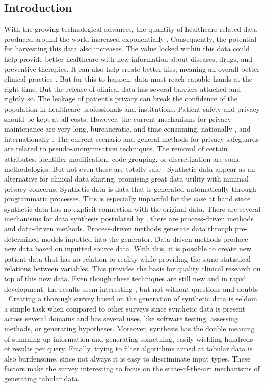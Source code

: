 
\subsection{Introduction}

With the growing technological advances, the quantity of healthcare-related data produced around the world increased exponentially \cite{choi_generating_2017,henry_adoption_2016}.
Consequently, the potential for harvesting this data also increases. The value locked within
this data could help provide better healthcare with new information about diseases,
drugs, and preventive therapies. It can also help create better \acp{his}, meaning an overall better clinical practice \cite{ISI:000502534100049}. But for this to happen, data must reach capable hands at the right time.
But the release of clinical data has several barriers attached and rightly so. The leakage of patient’s privacy can break the confidence of the population in healthcare
professionals and institutions. Patient safety
and privacy should be kept at all costs. However, the current mechanisms for privacy maintenance are very long, bureaucratic, and time-consuming, nationally \cite{comissao_nacional_protecao_de_dados_principios_2015}, and internationally \cite{office_for_civil_rights_guidance_2013}. The current scenario and general methods for privacy safeguards are related to pseudo-anonymisation techniques.
The removal of certain attributes, identifier modification, code grouping, or discretization are some methodologies. But not even these are totally safe \cite{el_emam_systematic_2011}.
Synthetic data appear as an alternative for clinical data sharing, promising great data
utility with minimal privacy concerns. Synthetic data is data that is generated automatically through programmatic processes. This is especially impactful for the case at hand
since synthetic data has no explicit connection with the original data. There are several
mechanisms for data synthesis postulated by \cite{goncalves_generation_2020}, there are
process-driven methods and data-driven methods. Process-driven methods generate
data through pre-determined models inputted into the generator. Data-driven methods
produce new data based on inputted source data. With this, it is possible to create new
patient data that has no relation to reality while providing the same statistical relations
between variables. This provides the basis for quality clinical research on top of this
new data. Even though these techniques are still new and in rapid development, the
results seem interesting \cite{goncalves_generation_2020}, but not without questions and doubts
\cite{stadler_synthetic_2020}.
Creating a thorough survey based on the generation of synthetic data is seldom a simple task when compared to other surveys since synthetic data is present across several domains and has several uses, like software testing, assessing methods, or generating hypotheses. Moreover, synthesis has
the double meaning of summing up information and generating something, easily wielding hundreds of results per query. Finally, trying to filter
algorithms aimed at tabular data is also burdensome, since not always it is easy to discriminate input types. These factors make the survey interesting to focus on the state-of-the-art mechanisms of generating tabular data.

